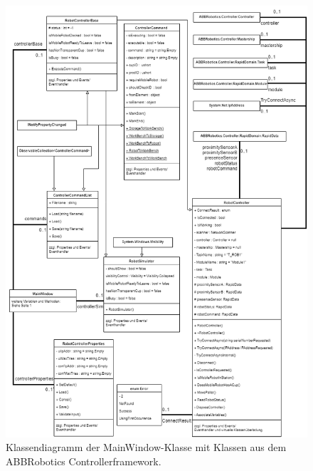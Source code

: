     \begin{figure}
        \caption[Klassendiagramm ABBRobotics Controller ]
        {\small Klassendiagramm der MainWindow-Klasse mit Klassen aus dem ABBRobotics Controllerframework. }\label{fig:figure3}
        \includegraphics[width = \textwidth ]{Bilder/LV_Klassendiagramm_ABBController}
        \centering
    \end{figure}

